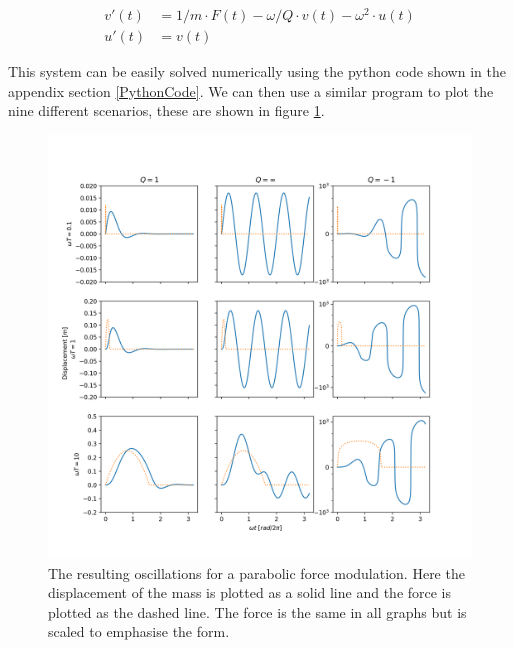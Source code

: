 \begin{align}
    v'(t) &= 1/m\cdot F(t)-\omega/Q\cdot v(t)- \omega^2\cdot u(t)\\
    u'(t) &= v(t)
\end{align}

This system can be easily solved numerically using the python code shown in the appendix section \ref{PythonCode}. We can then use a similar program to plot the nine different scenarios, these are shown in figure \ref{fig:fig_Q3}.\\

\vspace{-.5cm}
\begin{figure}[!h]
    \centering
    \includegraphics[width=.65\linewidth,keepaspectratio]{figures/Q3_omega_q_plot.png}
    \caption{The resulting oscillations for a parabolic force modulation. Here the displacement of the mass is plotted as a solid line and the force is plotted as the dashed line. The force is the same in all graphs but is scaled to emphasise the form. }
    \label{fig:fig_Q3}
\end{figure}

